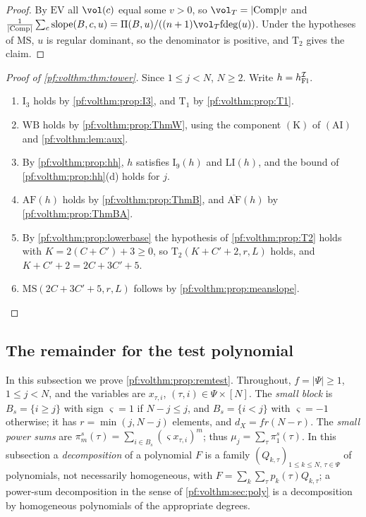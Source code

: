 \begin{proof}
By $\mathrm{EV}$ all $\vol(c)$ equal some $v>0$, so $\vol_T=|\mathrm{Comp}|v$ and
$\frac1{|\mathrm{Comp}|}\sum_c\mathrm{slope}(B,c,u)=\Pi(B,u)/((n+1)\vol_T\volthmfd(u))$. Under the hypotheses of
$\mathrm{MS}$, $u$ is regular dominant, so the denominator is positive, and $\mathrm{T}_2$ gives the claim.
\end{proof}

\begin{proof}[Proof of \cref{pf:volthm:thm:tower}]
Since $1\le j<N$, $N\ge2$. Write $h=h_{\mathrm{Fl}}^{\mathcal{I}}$.
\begin{enumerate}[label=(\arabic*)]
\item $\mathrm{I}_3$ holds by \cref{pf:volthm:prop:I3}, and $\mathrm{T}_1$ by \cref{pf:volthm:prop:T1}.
\item $\mathrm{WB}$ holds by \cref{pf:volthm:prop:ThmW}, using the component $(\mathrm{K})$ of
  $(\mathrm{AI})$ and \cref{pf:volthm:lem:aux}.
\item By \cref{pf:volthm:prop:hh}, $h$ satisfies $\mathrm{I}_9(h)$ and $\mathrm{LI}(h)$, and the bound of
  \cref{pf:volthm:prop:hh}(d) holds for $j$.
\item $\mathrm{AF}(h)$ holds by \cref{pf:volthm:prop:ThmB}, and $\overline{\mathrm{AF}}(h)$ by \cref{pf:volthm:prop:ThmBA}.
\item By \cref{pf:volthm:prop:lowerbase} the hypothesis of \cref{pf:volthm:prop:T2} holds with
  $K=2(C+C')+3\ge0$, so $\mathrm{T}_2(K+C'+2,r,L)$ holds, and $K+C'+2=2C+3C'+5$.
\item $\mathrm{MS}(2C+3C'+5,r,L)$ follows by \cref{pf:volthm:prop:meanslope}.\qedhere
\end{enumerate}
\end{proof}

\subsection{The remainder for the test polynomial}\label{pf:volthm:sec:remainder}

In this subsection we prove \cref{pf:volthm:prop:remtest}. Throughout, $f=|\Psi|\ge1$, $1\le j<N$, and the
variables are $x_{\tau,i}$, $(\tau,i)\in\Psi\times[N]$. The \emph{small block} is $B_s=\{i\ge j\}$ with sign
$\varsigma=1$ if $N-j\le j$, and $B_s=\{i<j\}$ with $\varsigma=-1$ otherwise; it has $r=\min(j,N-j)$ elements, and
$d_X=fr(N-r)$. The \emph{small power sums} are $\pi^s_m(\tau)=\sum_{i\in B_s}(\varsigma x_{\tau,i})^m$; thus
$\mu_j=\sum_\tau\pi^s_1(\tau)$. In this subsection a \emph{decomposition} of a polynomial $F$ is a family
$(Q_{k,\tau})_{1\le k\le N,\,\tau\in\Psi}$ of polynomials, not necessarily homogeneous, with
$F=\sum_k\sum_\tau p_k(\tau)Q_{k,\tau}$; a power-sum decomposition in the sense of \cref{pf:volthm:sec:poly} is a
decomposition by homogeneous polynomials of the appropriate degrees.


